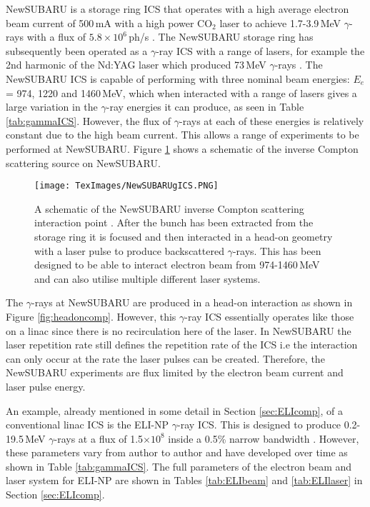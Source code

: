 \documentclass[11pt]{article}
\begin{document}
NewSUBARU is a storage ring ICS that operates with a high average electron beam current of 500\,mA with a high power CO$_{2}$ laser to achieve 1.7-3.9\,MeV $\gamma$-rays with a flux of $5.8\times 10^{6}$\,ph/s \cite{NewSUBARU}. The NewSUBARU storage ring has subsequently been operated as a $\gamma$-ray ICS with a range of lasers, for example the 2nd harmonic of the Nd:YAG laser which produced 73\,MeV $\gamma$-rays \cite{NewSUBARUbeam}. The NewSUBARU ICS is capable of performing with three nominal beam energies: $E_{e}$ = 974, 1220 and 1460\,MeV, which when interacted with a range of lasers gives a large variation in the $\gamma$-ray energies it can produce, as seen in Table \ref{tab:gammaICS}. However, the flux of $\gamma$-rays at each of these energies is relatively constant due to the high beam current. This allows a range of experiments to be performed at NewSUBARU. Figure \ref{fig:NewSUBICS} shows a schematic of the inverse Compton scattering source on NewSUBARU.

\begin{figure}[H]
\centering
\texttt{[image: TexImages/NewSUBARUgICS.PNG]}
\caption{\label{fig:NewSUBICS} A schematic of the NewSUBARU inverse Compton scattering interaction point \cite{HorikawaNewSUB}. After the bunch has been extracted from the storage ring it is focused and then interacted in a head-on geometry with a laser pulse to produce backscattered $\gamma$-rays. This has been designed to be able to interact electron beam from 974-1460\,MeV and can also utilise multiple different laser systems.}
\end{figure}

The $\gamma$-rays at NewSUBARU are produced in a head-on interaction as shown in Figure \ref{fig:headoncomp}. However, this $\gamma$-ray ICS essentially operates like those on a linac since there is no recirculation here of the laser. In NewSUBARU the laser repetition rate still defines the repetition rate of the ICS i.e the interaction can only occur at the rate the laser pulses can be created. Therefore, the NewSUBARU experiments are flux limited by the electron beam current and laser pulse energy. 

An example, already mentioned in some detail in Section \ref{sec:ELIcomp}, of a conventional linac ICS is the ELI-NP $\gamma$-ray ICS. This is designed to produce 0.2-19.5\,MeV $\gamma$-rays at a flux of 1.5$\times 10^{8}$ inside a 0.5\% narrow bandwidth \cite{ELIGales}. However, these parameters vary from author to author and have developed over time as shown in Table \ref{tab:gammaICS}. The full parameters of the electron beam and laser system for ELI-NP are shown in Tables \ref{tab:ELIbeam} and \ref{tab:ELIlaser} in Section \ref{sec:ELIcomp}. 
\end{document}
